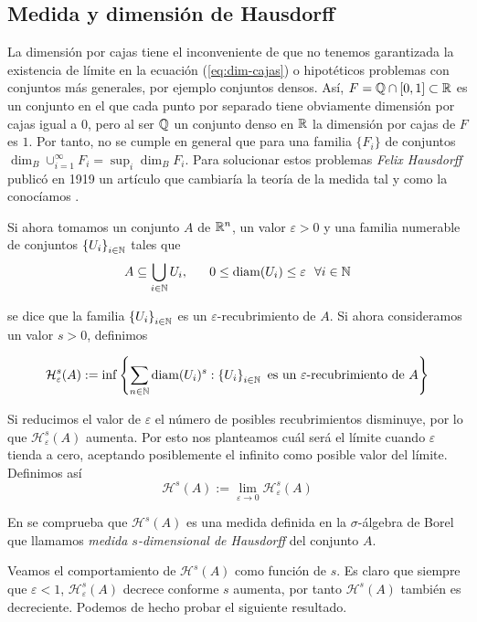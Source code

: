 \subsection{Medida y dimensión de Hausdorff}
\label{subsection:dim-Hausdorff}

La dimensión por cajas tiene el inconveniente de que no tenemos garantizada la existencia de límite en la ecuación (\ref{eq:dim-cajas}) o hipotéticos problemas con conjuntos más generales, por ejemplo conjuntos densos. Así, $F=\mathbb{Q}\cap[0,1]\subset\mathbb{R}$ es un conjunto en el que cada punto por separado tiene obviamente dimensión por cajas igual a 0, pero al ser $\mathbb{Q}$ un conjunto denso en $\mathbb{R}$ la dimensión por cajas de $F$ es $1$. Por tanto, no se cumple en general que para una familia $\{F_i\}$ de conjuntos $\dim_B\cup_{i=1}^\infty F_i = \sup_i\dim_B F_i$. Para solucionar estos problemas \textit{Felix Hausdorff} publicó en 1919 un artículo que cambiaría la teoría de la medida tal y como la conocíamos \cite{Hausdorff1919}. 


Si ahora tomamos un conjunto $A$ de $\mathbb{R}^n$, un valor $\varepsilon>0$ y una familia numerable de conjuntos $\left\lbrace U_i\right\rbrace_{i\in\mathbb{N}}$  tales que 
$$
A\subseteq\bigcup_{i\in\N} U_i, \ \ \ \ \ 0\leq\diam(U_i)\leq\varepsilon \ \ \forall i\in \N
$$

se dice que la familia $\left\lbrace U_i\right\rbrace_{i\in\mathbb{N}}$ es un $\varepsilon$-recubrimiento de $A$. Si ahora consideramos un valor $s>0$, definimos

$$
\mathcal{H}_\varepsilon^s(A):=\inf\left\lbrace\sum_{n\in\mathbb{N}} \mathrm{diam}(U_i)^s: \left\lbrace U_i\right\rbrace_{i\in\mathbb{N}} \text{ es un }\varepsilon\text{-recubrimiento de }A\right\rbrace
$$

Si reducimos el valor de $\varepsilon$ el número de posibles recubrimientos disminuye, por lo que $\mathcal{H}_\varepsilon^s(A)$ aumenta. Por esto nos planteamos cuál será el límite cuando $\varepsilon$ tienda a cero, aceptando posiblemente el infinito como posible valor del límite. Definimos así 
$$
\mathcal{H}^s(A) := \lim_{\varepsilon\rightarrow 0}\mathcal{H}_\varepsilon^s(A)
$$

En \cite[Secciones 5.2 y 5.4]{alma991007022459704990} se comprueba que $\mathcal{H}^s(A)$ es una medida definida en la $\sigma$-álgebra de Borel que llamamos \textit{medida $s$-dimensional de Hausdorff} del conjunto $A$.

Veamos el comportamiento de $\mathcal{H}^s(A)$ como función de $s$. Es claro que siempre que $\varepsilon < 1$, $\mathcal{H}_\varepsilon^s(A)$ decrece conforme $s$ aumenta, por tanto $\mathcal{H}^s(A)$ también es decreciente. Podemos de hecho probar el siguiente resultado.

